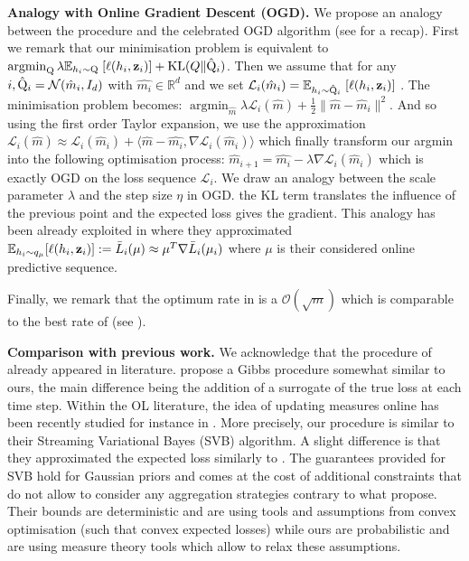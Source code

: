 \textbf{Analogy with Online Gradient Descent (OGD).} We propose an analogy between the procedure  and the celebrated OGD algorithm (see  for a recap). First we remark that our minimisation problem is equivalent to
$\operatorname{argmin}_{\mathrm{Q}} \lambda\mathbb{E}_{h_i\sim \mathrm{Q}} \; [\ell(h_i,\mathbf{z}_i)] + \operatorname{KL}(Q\| \hat{\mathrm{Q}}_{i})$.
Then we assume that for any $i, \hat{\mathrm{Q}}_i=\mathcal{N}(\hat{m}_i,I_d)$ with $\hat{m_i}\in\mathbb{R}^d$  and we set $\mathcal{L}_i(\hat{m}_i)= \mathbb{E}_{h_i\sim \hat{\mathrm{Q}}_i} \; [\ell(h_i,\mathbf{z}_i)] $ .
The minimisation problem becomes: $\operatorname{argmin}_{\hat{m}} \lambda\mathcal{L}_i(\hat{m}) + \frac{1}{2} \| \hat{m} - \hat{m}_i \|^2$.
And so using the first order Taylor expansion, we use the approximation $ \mathcal{L}_i(\hat{m}) \approx \mathcal{L}_i(\hat{m}_i ) + \langle \hat{m}- \hat{m_i}, \nabla \mathcal{L}_i(\hat{m}_i) \rangle $ which finally transform our argmin into the following optimisation process: $\hat{m}_{i+1} = \hat{m_i} - \lambda \nabla \mathcal{L}_i(\hat{m}_i)$ which is exactly OGD on the loss sequence $\mathcal{L}_i$.
We draw an analogy between the scale parameter $\lambda$ and the step size $\eta$ in OGD. the KL term translates the influence of the previous point and the expected loss gives the gradient.
This analogy has been already exploited in \citet{shalev2012online} where they approximated $\mathbb{E}_{h_i\sim q_\mu} [\ell(h_i,\mathbf{z}_i)]:= \bar{L}_i(\mu) \approx \mu^T\nabla \bar{L}_i(\mu_i)$ where $\mu$ is their considered online predictive sequence.

Finally, we remark that the optimum rate in  is a $\mathcal{O}(\sqrt{m})$ which is comparable to the best rate of \citet[][Eq (2.5)]{shalev2012online} (see ).



\textbf{Comparison with previous work.} We acknowledge that the procedure of  already appeared in literature. \citet[][Alg. 1]{li2018pac} propose a Gibbs procedure somewhat similar to ours, the main difference being the addition of a surrogate of the true loss at each time step.
Within the OL literature, the idea of updating measures online has been recently studied for instance in \citet{cherief2019generalization}. More precisely, our procedure is similar to their Streaming Variational Bayes (SVB) algorithm. A slight difference is that they approximated the expected loss similarly to \citet{shalev2012online}.
The guarantees \citet{cherief2019generalization} provided for SVB hold for Gaussian priors and comes at the cost of additional constraints that do not allow to consider any aggregation strategies contrary to what  propose. Their bounds are deterministic and are using tools and assumptions from convex optimisation (such that convex expected losses) while ours are probabilistic and are using measure theory tools which allow to relax these assumptions.


